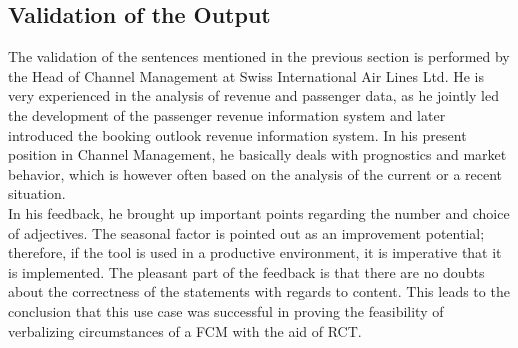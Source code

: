 \documentclass[conference]{IEEEtran}
\begin{document}
\subsection{Validation of the Output}
\label{subsec:validation}
The validation of the sentences mentioned in the previous section is performed by the Head of Channel Management at Swiss International Air Lines Ltd. He is very experienced in the analysis of revenue and passenger data, as he jointly led the development of the passenger revenue information system and later introduced the booking outlook revenue information system. In his present position in Channel Management, he basically deals with prognostics and market behavior, which is however often based on the analysis of the current or a recent situation.\\
In his feedback, he brought up important points regarding the number and choice of adjectives. The seasonal factor is pointed out as an improvement potential; therefore, if the tool is used in a productive environment, it is imperative that it is implemented. The pleasant part of the feedback is that there are no doubts about the correctness of the statements with regards to content. This leads to the conclusion that this use case was successful in proving the feasibility of verbalizing circumstances of a FCM with the aid of RCT.
\end{document}
